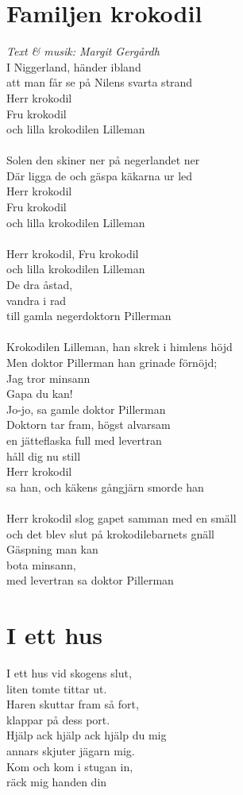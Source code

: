 \section{Familjen krokodil}
\textit{Text \& musik: Margit Gergårdh}
\vspace{2mm}\\
I Niggerland, händer ibland\\
att man får se på Nilens svarta strand\\
Herr krokodil\\
Fru krokodil\\
och lilla krokodilen Lilleman\\
\\
Solen den skiner ner på negerlandet ner\\
Där ligga de och gäspa käkarna ur led\\
Herr krokodil\\
Fru krokodil\\
och lilla krokodilen Lilleman\\
\\
Herr krokodil, Fru krokodil\\
och lilla krokodilen Lilleman\\
De dra åstad,\\
vandra i rad\\
till gamla negerdoktorn Pillerman\\
\\
Krokodilen Lilleman, han skrek i himlens höjd\\
Men doktor Pillerman han grinade förnöjd;\\
Jag tror minsann\\
Gapa du kan!\\
Jo-jo, sa gamle doktor Pillerman\\
\newpage
\noindent Doktorn tar fram, högst alvarsam\\
en jätteflaska full med levertran\\
håll dig nu still\\
Herr krokodil\\
sa han, och käkens gångjärn smorde han\\
\\
Herr krokodil slog gapet samman med en smäll\\
och det blev slut på krokodilebarnets gnäll\\
Gäspning man kan\\
bota minsann,\\
med levertran sa doktor Pillerman

\section{I ett hus}
I ett hus vid skogens slut,\\
liten tomte tittar ut.\\
Haren skuttar fram så fort,\\
klappar på dess port.\\
Hjälp ack hjälp ack hjälp du mig\\
annars skjuter jägarn mig.\\
Kom och kom i stugan in,\\
räck mig handen din

